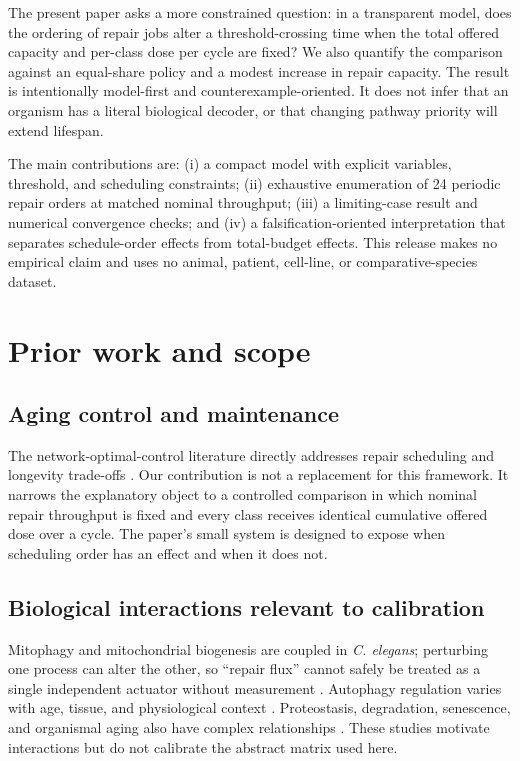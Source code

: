 \documentclass[10pt,letterpaper]{article}
\begin{document}
The present paper asks a more constrained question: in a transparent model, does the ordering of repair jobs alter a threshold-crossing time when the total offered capacity and per-class dose per cycle are fixed? We also quantify the comparison against an equal-share policy and a modest increase in repair capacity. The result is intentionally model-first and counterexample-oriented. It does not infer that an organism has a literal biological decoder, or that changing pathway priority will extend lifespan.

The main contributions are: (i) a compact model with explicit variables, threshold, and scheduling constraints; (ii) exhaustive enumeration of 24 periodic repair orders at matched nominal throughput; (iii) a limiting-case result and numerical convergence checks; and (iv) a falsification-oriented interpretation that separates schedule-order effects from total-budget effects. This release makes no empirical claim and uses no animal, patient, cell-line, or comparative-species dataset.

\section{Prior work and scope}
\subsection{Aging control and maintenance}
The network-optimal-control literature directly addresses repair scheduling and longevity trade-offs \cite{Sun2020OptimalControl}. Our contribution is not a replacement for this framework. It narrows the explanatory object to a controlled comparison in which nominal repair throughput is fixed and every class receives identical cumulative offered dose over a cycle. The paper's small system is designed to expose when scheduling order has an effect and when it does not.

\subsection{Biological interactions relevant to calibration}
Mitophagy and mitochondrial biogenesis are coupled in \textit{C. elegans}; perturbing one process can alter the other, so “repair flux” cannot safely be treated as a single independent actuator without measurement \cite{Palikaras2015Mitophagy}. Autophagy regulation varies with age, tissue, and physiological context \cite{Autophagy2017Wang}. Proteostasis, degradation, senescence, and organismal aging also have complex relationships \cite{HamazakiMurata2024Proteostasis}. These studies motivate interactions but do not calibrate the abstract matrix used here.
\end{document}
